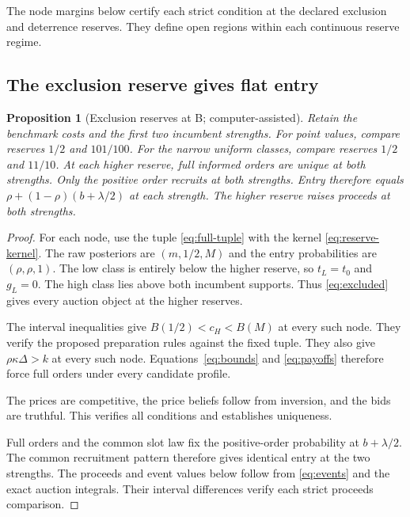 \documentclass[12pt]{article}
\newtheorem{proposition}{Proposition}
\begin{document}
The node margins below certify each strict condition at the declared exclusion and deterrence reserves.
They define open regions within each continuous reserve regime.

\subsection{The exclusion reserve gives flat entry}

\begin{proposition}[Exclusion reserves at B; computer-assisted]\label{prop:exclude}
Retain the benchmark costs and the first two incumbent strengths.
For point values, compare reserves $1/2$ and $101/100$.
For the narrow uniform classes, compare reserves $1/2$ and $11/10$.
At each higher reserve, full informed orders are unique at both strengths.
Only the positive order recruits at both strengths.
Entry therefore equals $\rho+(1-\rho)(b+\lambda/2)$ at each strength.
The higher reserve raises proceeds at both strengths.
\end{proposition}

\begin{proof}
For each node, use the tuple \eqref{eq:full-tuple} with the kernel \eqref{eq:reserve-kernel}.
The raw posteriors are $(m,1/2,M)$ and the entry probabilities are $(\rho,\rho,1)$.
The low class is entirely below the higher reserve, so $t_L=t_0$ and $g_L=0$.
The high class lies above both incumbent supports.
Thus \eqref{eq:excluded} gives every auction object at the higher reserves.

The interval inequalities give $B(1/2)<c_H<B(M)$ at every such node.
They verify the proposed preparation rules against the fixed tuple.
They also give $\rho\kappa\Delta>k$ at every such node.
Equations~\eqref{eq:bounds} and \eqref{eq:payoffs} therefore force full orders under every candidate profile.

The prices are competitive, the price beliefs follow from inversion, and the bids are truthful.
This verifies all conditions and establishes uniqueness.

Full orders and the common slot law fix the positive-order probability at $b+\lambda/2$.
The common recruitment pattern therefore gives identical entry at the two strengths.
The proceeds and event values below follow from \eqref{eq:events} and the exact auction integrals.
Their interval differences verify each strict proceeds comparison.
\end{proof}
\end{document}
